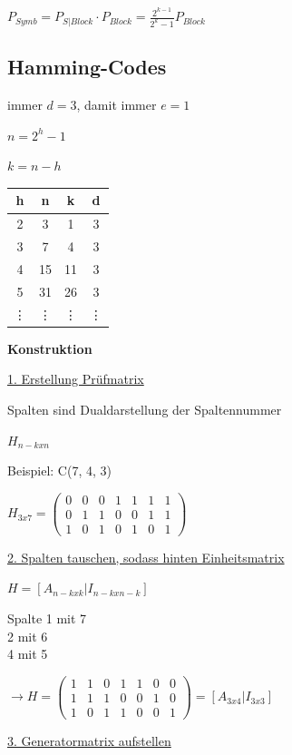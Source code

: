 $\displaystyle{
    P_{Symb} = P_{S|Block} \cdot P_{Block} = \frac{2^{k-1}}{2^k - 1} P_{Block}
}$

\subsection{Hamming-Codes}

immer $d=3$, damit immer $e=1$

$\displaystyle{
    n = 2^h - 1
}$

$\displaystyle{
    k = n - h
}$

\begin{tabular}{c|c c c}
    h & n & k & d\\
    \hline
    2 & 3 & 1 & 3\\
    3 & 7 & 4 & 3\\
    4 & 15 & 11 & 3\\
    5 & 31 & 26 & 3\\
    \vdots & \vdots & \vdots & \vdots
\end{tabular}

\textbf{Konstruktion}

\underline{1. Erstellung Prüfmatrix}

Spalten sind Dualdarstellung der Spaltennummer

$H_{n-k x n}$

Beispiel: C(7, 4, 3)

$\displaystyle{
    H_{3 x 7} = \begin{pmatrix}
        0 & 0 & 0 & 1 & 1 & 1 & 1\\
        0 & 1 & 1 & 0 & 0 & 1 & 1\\
        1 & 0 & 1 & 0 & 1 & 0 & 1
    \end{pmatrix}
}$

\underline{2. Spalten tauschen, sodass hinten Einheitsmatrix}

$H = [A_{n-k x k} | I_{n-k x n-k} ]$

Spalte 1 mit 7\\
2 mit 6\\
4 mit 5

$\displaystyle{
    \rightarrow H = \begin{pmatrix}
        1 & 1 & 0 & 1 & 1 & 0 & 0\\
        1 & 1 & 1 & 0 & 0 & 1 & 0\\
        1 & 0 & 1 & 1 & 0 & 0 & 1
    \end{pmatrix} = [ A_{3 x 4} | I_{3 x 3} ]
}$

\underline{3. Generatormatrix aufstellen}

